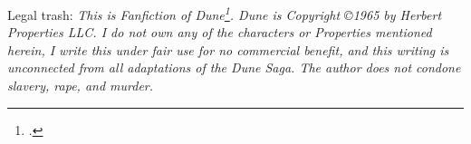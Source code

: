 \noindent Legal trash: \textit{This is Fanfiction of Dune\footcite{herbert_dune_2005}. Dune is Copyright \copyright 1965 by Herbert Properties LLC.
I do not own any of the characters or Properties mentioned herein, I write this under fair use for no commercial benefit, and this writing is unconnected from all adaptations of the Dune Saga.
The author does not condone slavery, rape, and murder.}\\
